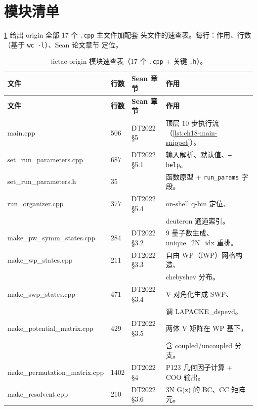 \section{模块清单}
\label{sec:ch18-modules}

\cref{tab:ch18-modules} 给出 origin 全部 17 个 \texttt{.cpp} 主文件加配套
头文件的速查表。每行：作用、行数（基于 \texttt{wc -l}）、Sean 论文章节
定位。

\begin{longtable}{p{3.6cm}p{1.0cm}p{2.4cm}p{6cm}}
\caption{tictac-origin 模块速查表（17 个 \texttt{.cpp} + 关键 \texttt{.h}）。}
\label{tab:ch18-modules}\\
\toprule
\textbf{文件} & \textbf{行数} & \textbf{Sean 章节} & \textbf{作用} \\
\midrule
\endfirsthead
\toprule
\textbf{文件} & \textbf{行数} & \textbf{Sean 章节} & \textbf{作用} \\
\midrule
\endhead
main.cpp                       & 506  & DT2022 §5    & 顶层 10 步执行流（\cref{lst:ch18-main-snippet}）。\\
set\_run\_parameters.cpp       & 687  & DT2022 §5.1  & 输入解析、默认值、\texttt{--help}。 \\
set\_run\_parameters.h         & 35   &              & 函数原型 + \texttt{run\_params} 字段。 \\
run\_organizer.cpp             & 377  & DT2022 §5.4  & on-shell q-bin 定位、\\
                               &      &              & deuteron 通道索引。 \\
make\_pw\_symm\_states.cpp     & 284  & DT2022 §3.2  & 9 量子数生成、unique\_2N\_idx 重排。\\
make\_wp\_states.cpp           & 211  & DT2022 §3.3  & 自由 WP（fWP）网格构造、\\
                               &      &              & chebyshev 分布。 \\
make\_swp\_states.cpp          & 471  & DT2022 §3.4  & V 对角化生成 SWP、 \\
                               &      &              & 调 LAPACKE\_dspevd。 \\
make\_potential\_matrix.cpp    & 429  & DT2022 §3.5  & 两体 V 矩阵在 WP 基下，\\
                               &      &              & 含 coupled/uncoupled 分支。 \\
make\_permutation\_matrix.cpp  & 1402 & DT2022 §4    & P123 几何因子计算 + COO 输出。 \\
make\_resolvent.cpp            & 210  & DT2022 §3.6  & 3N G(z) 的 BC、CC 矩阵元。\\

\end{longtable}
